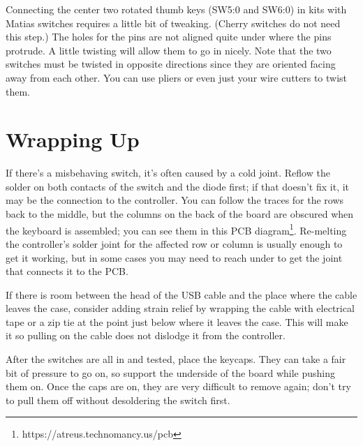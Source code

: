 \documentclass{article}
\begin{document}

Connecting the center two rotated thumb keys (SW5:0 and SW6:0) in kits
with Matias switches requires a little bit of tweaking. (Cherry
switches do not need this step.) The holes for the pins are not
aligned quite under where the pins protrude. A little twisting will
allow them to go in nicely. Note that the two switches must be twisted
in opposite directions since they are oriented facing away from each
other. You can use pliers or even just your wire cutters to twist
them.

\section{Wrapping Up}

If there's a misbehaving switch, it's often caused by a cold
joint. Reflow the solder on both contacts of the switch and the diode
first; if that doesn't fix it, it may be the connection to the
controller. You can follow the traces for the rows back to the middle,
but the columns on the back of the board are obscured when the
keyboard is assembled; you can see them in this PCB
diagram\footnote{https://atreus.technomancy.us/pcb}.
Re-melting the controller's solder joint for the affected row or
column is usually enough to get it working, but in some cases you may
need to reach under to get the joint that connects it to the PCB.

\vspace{1em}

If there is room between the head of the USB cable and the place where
the cable leaves the case, consider adding strain relief by wrapping
the cable with electrical tape or a zip tie at the point just below
where it leaves the case. This will make it so pulling on the cable
does not dislodge it from the controller.

\vspace{1em}

After the switches are all in and tested, place the keycaps. They can
take a fair bit of pressure to go on, so support the underside of the
board while pushing them on. Once the caps are on, they are very
difficult to remove again; don't try to pull them off without
desoldering the switch first.
\end{document}
